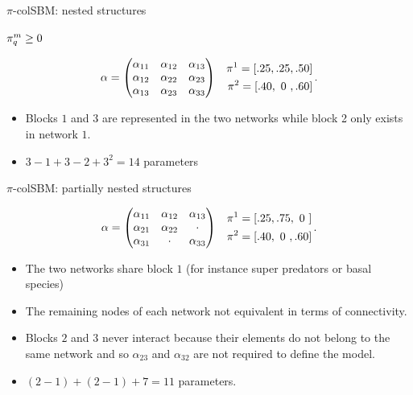 \documentclass[compress,10pt]{beamer}
\begin{document}
\begin{frame}{$\pi$-colSBM: nested structures}
 
 $\pi^{m}_q \geq 0$
 
\begin{eqnarray*}
\alpha = \begin{pmatrix}
    \alpha_{11} & \alpha_{12} & \alpha_{13} \\
    \alpha_{12} & \alpha_{22} & \alpha_{23} \\
    \alpha_{13} & \alpha_{23} & \alpha_{33}
\end{pmatrix} & &  \begin{aligned}
                      \pi^{1} = [.25, .25, .50] \\ \pi^{2} = [.40, \text{ }0\text{ }, .60]
                    \end{aligned}\, . 
\end{eqnarray*}
\begin{itemize}
 \item Blocks $1$ and $3$  are represented in the two networks while block 2 only exists in network $1$. 
 \item  $3-1 + 3-2+ 3^2 = 14$ parameters
\end{itemize}
\end{frame}

\begin{frame}{$\pi$-colSBM: partially nested structures}

\begin{eqnarray*}
    \alpha = \begin{pmatrix}
      \alpha_{11} & \alpha_{12} & \alpha_{13} \\
      \alpha_{21} & \alpha_{22} & \cdot \\
      \alpha_{31} & \cdot & \alpha_{33}
    \end{pmatrix} & &  \begin{aligned}
                      \pi^{1} = [.25, .75, \text{ }0\text{ }] \\ \pi^{2} = [.40, \text{ }0\text{ }, .60]
                    \end{aligned}\, . 
\end{eqnarray*}
  
\begin{itemize}
 \item The two networks share block $1$ (for instance super predators or basal species)
 \item The remaining nodes of each network not equivalent in terms of connectivity.
 \item Blocks $2$ and $3$ never interact because their elements do not belong to the same network and so $\alpha_{23}$ and $\alpha_{32}$ are not required to define the model.
 \item $(2-1) + (2-1) + 7 = 11$ parameters. 
\end{itemize}
\end{frame}
\end{document}

